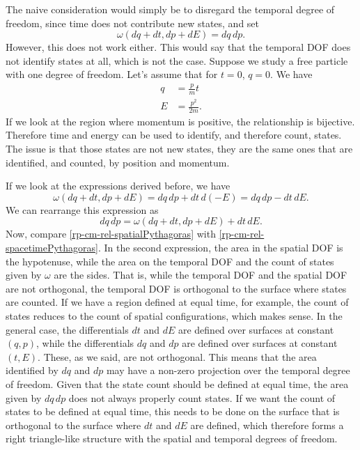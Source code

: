 The naive consideration would simply be to disregard the temporal degree of freedom, since time does not contribute new states, and set
\begin{equation}
	\omega(dq + dt, dp + dE) = dq \, dp.
\end{equation}
However, this does not work either. This would say that the temporal DOF does not identify states at all, which is not the case. Suppose we study a free particle with one degree of freedom. Let's assume that for $t=0$, $q=0$. We have
\begin{equation}
	\begin{aligned}
	q &= \frac{p}{m} t \\
	E &= \frac{p^2}{2m}.
	\end{aligned}
\end{equation}
If we look at the region where momentum is positive, the relationship is bijective. Therefore time and energy can be used to identify, and therefore count, states. The issue is that those states are not new states, they are the same ones that are identified, and counted, by position and momentum.

If we look at the expressions derived before, we have
\begin{equation}
	\omega(dq + dt, dp + dE) = dq \, dp + dt \, d(-E) = dq \, dp - dt \, dE.
\end{equation}
We can rearrange this expression as
\begin{equation}\label{rp-cm-rel-spacetimePythagoras}
	dq \, dp = \omega(dq + dt, dp + dE) + dt \, dE.
\end{equation}
Now, compare \ref{rp-cm-rel-spatialPythagoras} with \ref{rp-cm-rel-spacetimePythagoras}. In the second expression, the area in the spatial DOF is the hypotenuse, while the area on the temporal DOF and the count of states given by $\omega$ are the sides. That is, while the temporal DOF and the spatial DOF are not orthogonal, the temporal DOF is orthogonal to the surface where states are counted. If we have a region defined at equal time, for example, the count of states reduces to the count of spatial configurations, which makes sense. In the general case, the differentials $dt$ and $dE$ are defined over surfaces at constant $(q, p)$, while the differentials $dq$ and $dp$ are defined over surfaces at constant $(t,E)$. These, as we said, are not orthogonal. This means that the area identified by $dq$ and $dp$ may have a non-zero projection over the temporal degree of freedom. Given that the state count should be defined at equal time, the area given by $dq \, dp$ does not always properly count states. If we want the count of states to be defined at equal time, this needs to be done on the surface that is orthogonal to the surface where $dt$ and $dE$ are defined, which therefore forms a right triangle-like structure with the spatial and temporal degrees of freedom.

